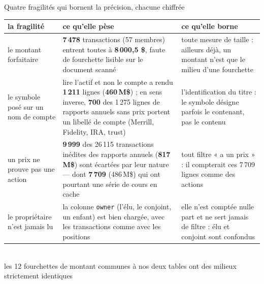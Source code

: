 \documentclass[11pt,aspectratio=169]{beamer}
\newcommand{\co}[1]{\texttt{#1}}
\newcommand{\defl}[1]{{\scriptsize\color{black!55}#1}}
\begin{document}
\begin{frame}{Quatre fragilités qui bornent la précision, chacune chiffrée}
  \centering
  {\footnotesize\begin{tabular}{>{\raggedright\arraybackslash}p{} >{\raggedright\arraybackslash}p{} >{\raggedright\arraybackslash}p{}}
    \toprule
    \textbf{la fragilité} & \textbf{ce qu'elle pèse} & \textbf{ce qu'elle borne}\\
    \midrule
    le montant forfaitaire
      & \textbf{7\,478} transactions (57 membres) entrent toutes à \textbf{8\,000,5 \$}, faute de
        fourchette lisible sur le document scanné
      & toute mesure de taille : ailleurs déjà, un montant n'est que le milieu d'une fourchette\\[2mm]
    le symbole posé sur un nom de compte
      & lire l'actif et non le compte a rendu \textbf{1\,211} lignes (\textbf{460\,M\$}) ; en sens
        inverse, \textbf{700} des 1\,275 lignes de rapports annuels sans prix portent un libellé de
        compte (Merrill, Fidelity, IRA, trust)
      & l'identification du titre : le symbole désigne parfois le contenant, pas le contenu\\[2mm]
    un prix ne prouve pas une action
      & \textbf{9\,999} des 26\,115 transactions inédites des rapports annuels (\textbf{817\,M\$})
        sont écartées par leur nature --- dont \textbf{7\,709} (486\,M\$) qui ont pourtant une
        série de cours en cache
      & tout filtre « a un prix » : il compterait ces 7\,709 lignes comme des actions\\[2mm]
    le propriétaire n'est jamais lu
      & la colonne \co{owner} (l'élu, le conjoint, un enfant) est bien chargée, avec les
        transactions comme avec les positions
      & elle n'est comptée nulle part et ne sert jamais de filtre : élu et conjoint sont confondus\\
    \bottomrule
  \end{tabular}}\\[1.5mm]
  \defl{les 12 fourchettes de montant communes à nos deux tables ont des milieux strictement identiques}
\end{frame}
\end{document}
